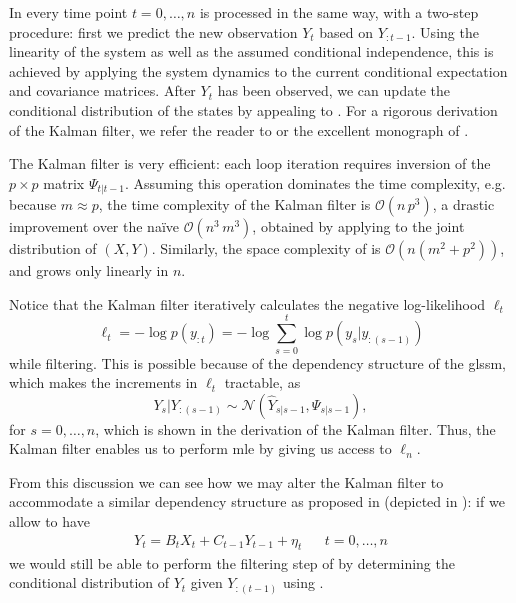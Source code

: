 In  every time point $t = 0, \dots, n$ is processed in the same way, with a two-step procedure: first we predict the new observation $Y_{t}$ based on $Y_{:t-1}$. Using the linearity of the system as well as the assumed conditional independence, this is achieved by applying the system dynamics to the current conditional expectation and covariance matrices. After $Y_{t}$ has been observed, we can update the conditional distribution of the states by appealing to . For a rigorous derivation of the Kalman filter, we refer the reader to \citep[Chapter 4]{Durbin2012Time} or the excellent monograph of \citep{Schneider1986Kalmanfilter}. 

The Kalman filter is very efficient: each loop iteration requires inversion of the $p \times p$ matrix $\Psi_{t | t - 1}$. Assuming this operation dominates the time complexity, e.g. because $m \approx p$, the time complexity of the Kalman filter is $\mathcal O(n\,p^{3})$, a drastic improvement over the naïve $\mathcal O(n^{3}\,m^{3})$, obtained by applying  to the joint distribution of $(X,Y)$. Similarly, the space complexity of  is $\mathcal O \left( n \left( m^{2} + p^{2} \right) \right)$, and grows only linearly in $n$.

Notice that the Kalman filter iteratively calculates the negative log-likelihood $\ell_{t}$
$$\ell_{t} = - \log p(y_{:t}) = - \log \sum_{s = 0}^t \log p(y_{s} | y_{:(s - 1)})$$ 
while filtering. This is possible because of the dependency structure of the \gls{glssm}, which makes the increments in $\ell_{t}$ tractable, as
$$
Y_{s} | Y_{:(s -1)} \sim \mathcal N \left( \hat Y_{s|s-1}, \Psi_{s|s - 1} \right),
$$
for $s = 0, \dots, n$, which is shown in the derivation of the Kalman filter. Thus, the Kalman filter enables us to perform \gls{mle} by giving us access to $\ell_{n}$.

From this discussion we can see how we may alter the Kalman filter to accommodate a similar dependency structure as proposed in  (depicted in ): if we allow to have 
\begin{align*}
    Y_{t} = B_{t}X_{t} + C_{t-1}Y_{t - 1} + \eta_{t} && t  = 0, \dots, n
\end{align*}
we would still be able to perform the filtering step of  by determining the conditional distribution of $Y_{t}$ given $Y_{:(t-1)}$ using .

